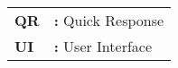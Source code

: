 \hspace{-3mm}
\begin{tabular}{p{2cm}l}
{\bf{QR}} & {\bf:} Quick Response\\
{\bf{UI}} & {\bf:} User Interface\\


\end{tabular}


